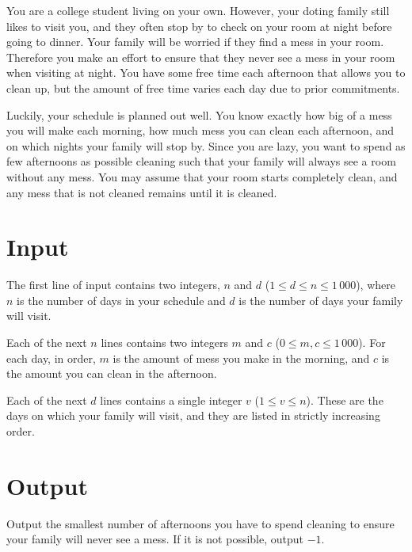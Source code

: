 
You are a college student living on your own.
However, your doting family still likes to visit you, and
they often stop by to check on your room at night before going to dinner.
Your family will be worried if they find a mess in your room.
Therefore you make an effort to ensure that they never see a mess in your room when visiting at night.
You have some free time each afternoon that allows you to clean up,
but the amount of free time varies each day due to prior commitments.

Luckily, your schedule is planned out well.
You know exactly how big of a mess you will make each morning, 
how much mess you can clean each afternoon, 
and on which nights your family will stop by. 
Since you are lazy, you want to spend as few afternoons as possible cleaning such that your family will always see a room without any mess. 
You may assume that your room starts completely clean, and any mess that is not cleaned remains until it is cleaned.

\section*{Input}

The first line of input contains two integers, $n$ and $d$ ($1 \leq d \leq n \leq 1\,000$), where $n$ is the number of days
in your schedule and $d$ is the number of days your family will visit. 

Each of the next $n$ lines contains two integers $m$ and $c$ ($0 \le m,c \le 1\,000$). For each day, in order, $m$ is the amount of mess you make in the morning, and $c$ is the amount you can clean in the afternoon.

Each of the next $d$ lines contains a single integer $v$ ($1 \le v \le n$). These are the days on which your family will visit, and they are listed in strictly increasing order.  


\section*{Output}

Output the smallest number of afternoons you have to spend cleaning
to ensure your family will never see a mess.  
If it is not possible, output $-1$.
